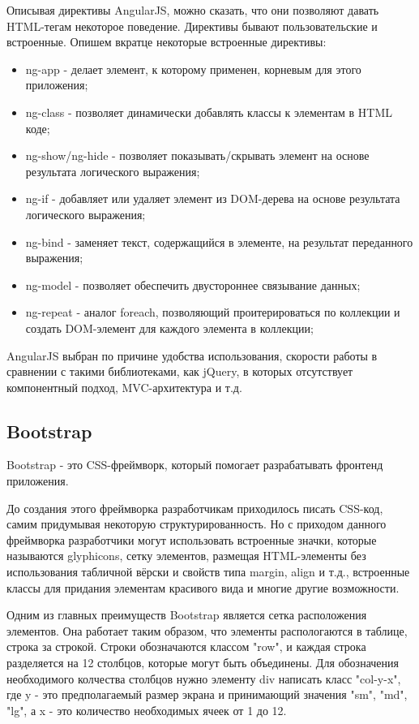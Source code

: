 Описывая директивы AngularJS, можно сказать, что они позволяют давать HTML-тегам некоторое поведение. Директивы бывают пользовательские и встроенные. Опишем вкратце некоторые встроенные директивы:

\begin{itemize}
  \item ng-app - делает элемент, к которому применен, корневым для этого приложения;
  \item ng-class - позволяет динамически добавлять классы к элементам в HTML коде;
  \item ng-show/ng-hide - позволяет показывать/скрывать элемент на основе результата логического выражения;
  \item ng-if - добавляет или удаляет элемент из DOM-дерева на основе результата логического выражения;
  \item ng-bind - заменяет текст, содержащийся в элементе, на результат переданного выражения;
  \item ng-model - позволяет обеспечить двустороннее связывание данных;
  \item ng-repeat - аналог foreach, позволяющий проитерироваться по коллекции и создать DOM-элемент для каждого элемента в коллекции;
\end{itemize}

AngularJS выбран по причине удобства использования, скорости работы в сравнении с такими библиотеками, как jQuery, в которых отсутствует компонентный подход, MVC-архитектура и т.д.

\subsection{Bootstrap}
\label{sub:technologies:bootstrap}
Bootstrap - это CSS-фреймворк, который помогает разрабатывать фронтенд приложения.

До создания этого фреймворка разработчикам приходилось писать CSS-код, самим придумывая некоторую структурированность. Но с приходом данного фреймворка разработчики могут использовать встроенные значки, которые называются glyphicons, сетку элементов, размещая HTML-элементы без использования табличной вёрски и свойств типа margin, align и т.д., встроенные классы для придания элементам красивого вида и многие другие возможности.

Одним из главных преимуществ Bootstrap является сетка расположения элементов. Она работает таким образом, что элементы распологаются в таблице, строка за строкой. Строки обозначаются классом "row", и каждая строка разделяется на 12 столбцов, которые могут быть объединены. Для обозначения необходимого колчества столбцов нужно элементу div написать класс "col-y-x", где y - это предполагаемый размер экрана и принимающий значения "sm", "md", "lg", а x - это количество необходимых ячеек от 1 до 12.
